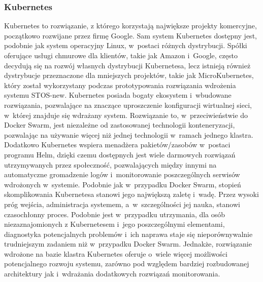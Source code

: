 \subsubsection{Kubernetes}
Kubernetes to rozwiązanie, z którego korzystają największe projekty komercyjne\cite{googleKubernetes}, początkowo rozwijane przez firmę Google. Sam system Kubernetes dostępny jest, podobnie jak system operacyjny Linux, w~postaci różnych dystrybucji. Spółki oferujące usługi chmurowe dla klientów, takie jak Amazon i~Google, często decydują się na rozwój własnych dystrybucji Kubernetesa, lecz istnieją również dystrybucje przeznaczone dla mniejszych projektów, takie jak MicroKubernetes\cite{microk8s}, który został wykorzystany podczas prototypowania rozwiązania wdrożenia systemu STOS-new. Kubernetes posiada bogaty ekosystem i~wbudowane rozwiązania, pozwalające na znaczące uproszczenie konfiguracji wirtualnej sieci, w~której znajduje się wdrażany system. Rozwiązanie to, w~przeciwieństwie do Docker Swarm, jest niezależne od zastosowanej technologii konteneryzacji, pozwalając na używanie więcej niż jednej technologii w~ramach jednego klastra. Dodatkowo Kubernetes wspiera menadżera pakietów/zasobów w~postaci programu Helm\cite{k8sHelm}, dzięki czemu dostępnych jest wiele darmowych rozwiązań utrzymywanych przez społeczność, pozwalających między innymi na automatyczne gromadzenie logów i~monitorowanie poszczególnych serwisów wdrożonych w~systemie. Podobnie jak w~przypadku Docker Swarm, stopień skomplikowania Kubernetesa stanowi jego największą zaletę i~wadę. Przez wysoki próg wejścia, administracja systemem, a~w~szczególności jej nauka, stanowi czasochłonny proces. Podobnie jest w~przypadku utrzymania, dla osób niezaznajomionych z Kubernetesem i~jego poszczególnymi elementami, diagnostyka potencjalnych problemów i~ich naprawa staje się nieporównywalnie trudniejszym zadaniem niż w~przypadku Docker Swarm. Jednakże, rozwiązanie wdrożone na bazie klastra Kubernetes oferuje o~wiele więcej możliwości potencjalnego rozwoju systemu, zarówno pod względem bardziej rozbudowanej architektury jak i~wdrażania dodatkowych rozwiązań monitorowania.

